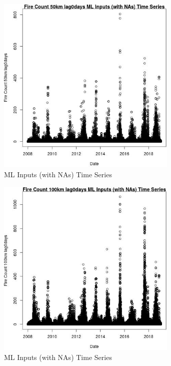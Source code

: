 \begin{figure} 
\centering  
\includegraphics[width=0.77\textwidth]{Code_Outputs/Report_ML_input_PM25_Step4_part_f_de_duplicated_aveswNAs_Fire_Count_50km_lag0daysvDate.jpg} 
\caption{\label{fig:Report_ML_input_PM25_Step4_part_f_de_duplicated_aveswNAsFire_Count_50km_lag0daysvDate}ML Inputs (with NAs) Time Series} 
\end{figure} 
 

\clearpage 

\begin{figure} 
\centering  
\includegraphics[width=0.77\textwidth]{Code_Outputs/Report_ML_input_PM25_Step4_part_f_de_duplicated_aveswNAs_Fire_Count_100km_lag0daysvDate.jpg} 
\caption{\label{fig:Report_ML_input_PM25_Step4_part_f_de_duplicated_aveswNAsFire_Count_100km_lag0daysvDate}ML Inputs (with NAs) Time Series} 
\end{figure} 
 


